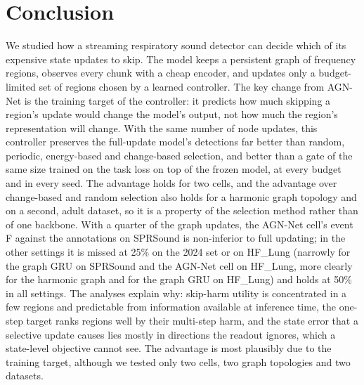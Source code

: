 \section{Conclusion}
\label{sec:conclusion}

We studied how a streaming respiratory sound detector can decide which of its expensive state updates to skip. The model keeps a persistent graph of frequency regions, observes every chunk with a cheap encoder, and updates only a budget-limited set of regions chosen by a learned controller. The key change from AGN-Net is the training target of the controller: it predicts how much skipping a region's update would change the model's output, not how much the region's representation will change. With the same number of node updates, this controller preserves the full-update model's detections far better than random, periodic, energy-based and change-based selection, and better than a gate of the same size trained on the task loss on top of the frozen model, at every budget and in every seed. The advantage holds for two cells, and the advantage over change-based and random selection also holds for a harmonic graph topology and on a second, adult dataset, so it is a property of the selection method rather than of one backbone. With a quarter of the graph updates, the AGN-Net cell's event F against the annotations on SPRSound is non-inferior to full updating; in the other settings it is missed at 25\% on the 2024 set or on HF\_Lung (narrowly for the graph GRU on SPRSound and the AGN-Net cell on HF\_Lung, more clearly for the harmonic graph and for the graph GRU on HF\_Lung) and holds at 50\% in all settings. The analyses explain why: skip-harm utility is concentrated in a few regions and predictable from information available at inference time, the one-step target ranks regions well by their multi-step harm, and the state error that a selective update causes lies mostly in directions the readout ignores, which a state-level objective cannot see. The advantage is most plausibly due to the training target, although we tested only two cells, two graph topologies and two datasets.

